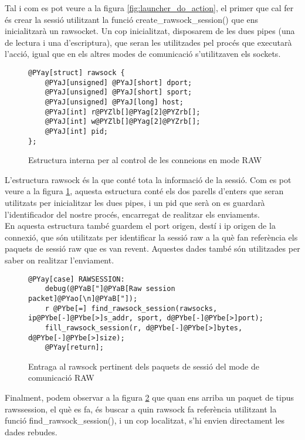 Tal i com es pot veure a la figura \ref{fig:launcher_do_action}, el primer que cal fer és crear la sessió utilitzant la funció
create\_rawsock\_session() que ens inicialitzarà un rawsocket. Un cop inicialitzat, disposarem de les dues 
pipes (una de lectura i una d'escriptura), que seran les utilitzades pel procés que executarà l'acció, 
igual que en els altres modes de comunicació s'utilitzaven els sockets.\\

\begin{figure}[h!]
\begin{Verbatim}[commandchars=@\[\]]
@PYay[struct] rawsock {
    @PYaJ[unsigned] @PYaJ[short] dport;
    @PYaJ[unsigned] @PYaJ[short] sport;
    @PYaJ[unsigned] @PYaJ[long] host;
    @PYaJ[int] r@PYZlb[]@PYag[2]@PYZrb[];
    @PYaJ[int] w@PYZlb[]@PYag[2]@PYZrb[];
	@PYaJ[int] pid;
};
\end{Verbatim}
    \caption{Estructura interna per al control de les conneions en mode RAW}
    \label{fig:struct_rawsock}
\end{figure}

L'estructura rawsock és la que conté tota la informació de la sessió. Com es pot veure a la figura \ref{fig:struct_rawsock},
aquesta estructura conté els dos parells d'enters que seran utilitzats per inicialitzar les dues pipes, i
un pid que serà on es guardarà l'identificador del nostre procés, encarregat de realitzar els enviaments. \\
En aquesta estructura també guardem el port origen, destí i ip origen de la connexió, que són utilitzats per 
identificar la sessió raw a la què fan referència els paquets de sessió raw que es van revent. Aquestes dades
també són utilitzades per saber on realitzar l'enviament. \\

\begin{figure}[h!]
\begin{Verbatim}[commandchars=@\[\]]
@PYay[case] RAWSESSION:
    debug(@PYaB["]@PYaB[Raw session packet]@PYao[\n]@PYaB["]);
    r @PYbe[=] find_rawsock_session(rawsocks, ip@PYbe[-]@PYbe[>]s_addr, sport, d@PYbe[-]@PYbe[>]port);
    fill_rawsock_session(r, d@PYbe[-]@PYbe[>]bytes, d@PYbe[-]@PYbe[>]size);
    @PYay[return];
\end{Verbatim}
    \caption{Entraga al rawsock pertinent dels paquets de sessió del mode de comunicació RAW}
    \label{fig:launcer_rawsession}
\end{figure}

Finalment, podem observar a la figura \ref{fig:launcer_rawsession} que quan ens arriba un paquet de 
tipus rawssession, el què es fa, és buscar a quin rawsock fa referència utilitzant la funció 
find\_rawsock\_session(), i un cop localitzat, s'hi envien directament les dades rebudes.


